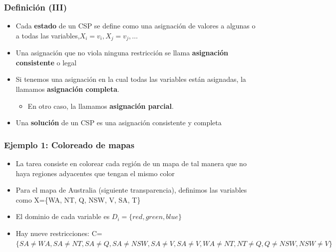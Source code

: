 \documentclass{beamer}
\begin{document}
\begin{frame}  \frametitle{Definición (III)} \footnotesize

\begin{itemize}
\item Cada \textbf{estado} de un CSP se define como una asignación de valores a algunas o a todas las variables,$ {X_i=v_i, X_j=v_j,\ldots }$

\item Una asignación que no viola ninguna restricción se llama \textbf{asignación consistente} o legal


\item Si tenemos una asignación en la cual todas las variables están asignadas, la llamamos \textbf{asignación completa}. 
\begin{itemize}
\item En otro caso, la llamamos \textbf{asignación parcial}.
\end{itemize}

\item Una \textbf{solución} de un CSP es una asignación consistente y completa



\end{itemize}

\end{frame} 


\begin{frame}  \frametitle{Ejemplo 1: Coloreado de mapas} \footnotesize

\begin{itemize}



\item La tarea consiste en colorear cada región de un mapa de tal manera que no haya regiones adyacentes que tengan el mismo color
\item Para el mapa de Australia (siguiente transparencia), definimos las variables como X=\{WA, NT, Q, NSW, V, SA, T\}
\item El dominio de cada variable es $D_i=\{red, green, blue\}$
\item Hay nueve restricciones: C=$\{SA \neq WA, SA \neq NT, SA\neq Q, SA \neq NSW, SA \neq V , SA\neq V, WA\neq NT , NT \neq Q, Q \neq NSW, NSW \neq V\}$


\end{itemize}

\end{frame} 
\end{document}
